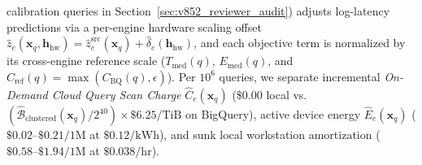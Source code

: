 \documentclass[10pt,a4paper]{article}
\begin{document}
calibration queries in Section~\ref{sec:v852_reviewer_audit}) adjusts log-latency predictions via a per-engine hardware scaling offset $\hat{z}_e(\mathbf{x}_q, \mathbf{h}_{\text{hw}}) = \hat{z}_e^{\text{src}}(\mathbf{x}_q) + \hat{\delta}_e(\mathbf{h}_{\text{hw}})$, and each objective term is normalized by its cross-engine reference scale ($T_{\text{med}}(q)$, $E_{\text{med}}(q)$, and $C_{\text{ref}}(q) = \max(C_{\text{BQ}}(q), \epsilon)$). Per $10^6$ queries, we separate incremental \emph{On-Demand Cloud Query Scan Charge} $\hat{C}_e(\mathbf{x}_q)$ ($\$0.00$ local vs.\ $(\hat{\mathcal{B}}_{\text{clustered}}(\mathbf{x}_q)/2^{40})\times\$6.25/\text{TiB}$ on BigQuery), active device energy $\hat{E}_e(\mathbf{x}_q)$ ($\$0.02\text{--}\$0.21/1\text{M}$ at $\$0.12/\text{kWh}$), and sunk local workstation amortization ($\$0.58\text{--}\$1.94/1\text{M}$ at $\$0.038/\text{hr}$).
\end{document}
